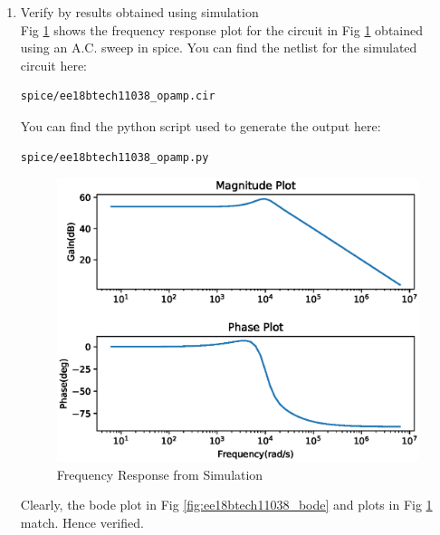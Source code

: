 \begin{enumerate}[label=\arabic*.,ref=\theenumi]
\item Verify by results obtained using simulation\\
\solution Fig \ref{fig:ee18btech11038_freqres} shows the frequency response plot for the circuit in Fig \ref{fig:ee18btech11038_freqres} obtained using an A.C. sweep in spice.
You can find the netlist for the simulated circuit here:
\begin{lstlisting}
spice/ee18btech11038_opamp.cir
\end{lstlisting}
You can find the python script used to generate the output here:
\begin{lstlisting}
spice/ee18btech11038_opamp.py
\end{lstlisting}
\begin{figure}[!ht]
\centering
\includegraphics[width=\columnwidth]{./figs/ee18btech11038_freqres.eps}
\caption{Frequency Response from Simulation}
\label{fig:ee18btech11038_freqres}
\end{figure}

Clearly, the bode plot in Fig \ref{fig:ee18btech11038_bode} and plots in Fig \ref{fig:ee18btech11038_freqres} match. Hence verified.











\end{enumerate}


